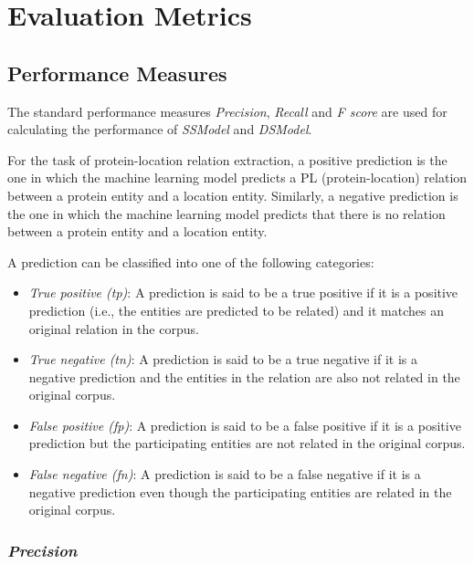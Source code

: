 \section{Evaluation Metrics} \label{sec:evaluationCriteria}

\subsection{Performance Measures}

The standard performance measures \textit{Precision}, \textit{Recall} and \textit{F score} are used for calculating the performance of \textit{SSModel} and \textit{DSModel}.

For the task of protein-location relation extraction, a positive prediction is the one in which the machine learning model predicts a PL (protein-location) relation between a protein entity and a location entity. Similarly, a negative prediction is the one in which the machine learning model predicts that there is no relation between a protein entity and a location entity.

A prediction can be classified into one of the following categories:


\begin{itemize}

\item \textit{True positive (tp)}: A prediction is said to be a true positive if it is a positive prediction (i.e., the entities are predicted to be related) and it matches an original relation in the corpus.

\item \textit{True negative (tn)}: A prediction is said to be a true negative if it is a negative prediction and the entities in the relation are also not related in the original corpus.

\item \textit{False positive (fp)}: A prediction is said to be a false positive if it is a positive prediction but the participating entities are not related in the original corpus.

\item \textit{False negative (fn)}: A prediction is said to be a false negative if it is a negative prediction even though the participating entities are related in the original corpus.

\end{itemize}

\subsubsection*{\textit{Precision}}\label{subsubsec:Prec}

